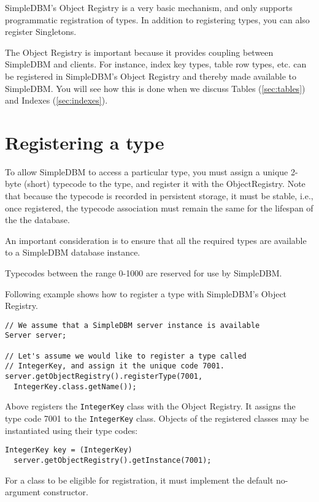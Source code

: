 \documentclass[a4paper,draft,oneside]{book}
\begin{document}
SimpleDBM's Object Registry is a very basic mechanism, and only
supports programmatic registration of types. In addition to
registering types, you can also register Singletons.

The Object Registry is important because it provides
coupling between SimpleDBM and clients. For instance, index key
types, table row types, etc. can be registered in SimpleDBM's
Object Registry and thereby made available to SimpleDBM. You will
see how this is done when we discuss Tables (\ref{sec:tables}) and 
Indexes (\ref{sec:indexes}).

\section{Registering a type}
To allow SimpleDBM to access a particular type, you must assign a
unique 2-byte (short) typecode to the type, and register it with the
ObjectRegistry. Note that because the typecode is recorded in
persistent storage, it must be stable, i.e., once registered, the
typecode association must remain the same for the lifespan of the
the database. 

An important consideration is to ensure that all the required types
are available to a SimpleDBM database instance. 

Typecodes between the range 0-1000 are reserved for use by
SimpleDBM.

Following example shows how to register a type with SimpleDBM's Object
Registry.

\begin{verbatim}
// We assume that a SimpleDBM server instance is available
Server server;		

// Let's assume we would like to register a type called
// IntegerKey, and assign it the unique code 7001. 
server.getObjectRegistry().registerType(7001,
  IntegerKey.class.getName());
\end{verbatim}

Above registers the \verb|IntegerKey| class with the Object Registry. It
assigns the type code 7001 to the \verb|IntegerKey| class. Objects of the
registered classes may be instantiated using their type codes:

\begin{verbatim}
IntegerKey key = (IntegerKey) 
  server.getObjectRegistry().getInstance(7001);
\end{verbatim}

For a class to be eligible for registration, it must implement the
default no-argument constructor.
\end{document}
